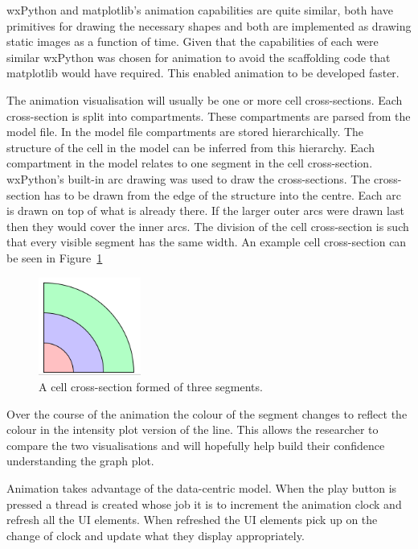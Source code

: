 wxPython and matplotlib's animation capabilities are quite similar, both have primitives for drawing the necessary shapes and both are implemented as drawing static images as a function of time.  Given that the capabilities of each were similar wxPython was chosen for animation to avoid the scaffolding code that matplotlib would have required.  This enabled animation to be developed faster.

The animation visualisation will usually be one or more cell cross-sections.  Each cross-section is split into compartments. These compartments are parsed from the model file.  In the model file compartments are stored hierarchically.  The structure of the cell in the model can be inferred from this hierarchy.  Each compartment in the model relates to one segment in the cell cross-section.  wxPython's built-in arc drawing was used to draw the cross-sections.  The cross-section has to be drawn from the edge of the structure into the centre.  Each arc is drawn on top of what is already there.  If the larger outer arcs were drawn last then they would cover the inner arcs.  The division of the cell cross-section is such that every visible segment has the same width.  An example cell cross-section can be seen in Figure~\ref{fig:cell_segment}

\begin{figure}[h!]
    \centering
    \includegraphics[width=0.3\textwidth]{images/cell_segment.png}
    \caption{A cell cross-section formed of three segments.}
    \label{fig:cell_segment}
\end{figure}

Over the course of the animation the colour of the segment changes to reflect the colour in the intensity plot version of the line.  This allows the researcher to compare the two visualisations and will hopefully help build their confidence understanding the graph plot.

Animation takes advantage of the data-centric model.  When the play button is pressed a thread is created whose job it is to increment the animation clock and refresh all the \ac{UI} elements.  When refreshed the \ac{UI} elements pick up on the change of clock and update what they display appropriately.

